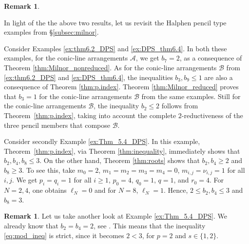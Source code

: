 \documentclass[11pt]{amsart}
\theoremstyle{plain}
\theoremstyle{definition}
\newtheorem{remark}[thm]{Remark}
\begin{document}
\begin{remark}
\label{rem:ex_milnor}
 
In light of the the above two results, %
let us revisit the Halphen pencil type examples from \S\ref{subsec:milnor}.

Consider Examples \ref{ex:thm6.2_DPS} and \ref{ex:DPS_thm6.4}. In both these examples, for the conic-line arrangements $\mathcal{A}$, we get $b_7 = 2$, as a consequence of Theorem \ref{thm:Milnor_nonreduced}.
 As for the conic-line arrangements $\mathcal{B}$ from \ref{ex:thm6.2_DPS} and \ref{ex:DPS_thm6.4}, the inequalities $b_3, b_9 \leq 1$ are also a consequence of Theorem 
\ref{thm:p.index}. Theorem \ref{thm:Milnor_reduced} proves that $b_3=1$ for the conic-line arrangements $\mathcal{B}$ from the same examples.
Still for the conic-line arrangements $\mathcal{B}$, the inequality $b_2 \leq 2$ follows from Theorem~\ref{thm:p.index}, taking into account the complete $2$-reductiveness of the three pencil members that compose $\mathcal{B}$. 

Consider secondly Example \ref{ex:Thm_5.4_DPS}. In this example, Theorem~\ref{thm:p.index}, via Theorem \ref{thm:inequality}, immediately shows that $b_2,b_4,b_8 \leq 3$.
On the other hand, Theorem \ref{thm:roots} shows that $b_2, b_4 \geq 2$ and $b_8 \geq 3$. To see this, take   $m_0=2$, $m_1=m_2=m_3=m_4 =0$, 
$m_{i,j}=\nu_{i,j}=1$ for all $i,j$. 
 We get $p_i=q_i=1$ for all $i \geq 1$, $p_0=4$, $q_0=1$, $q=1$, and $r_0=4$.
 For $N=2,4$, one obtains $\ell_N=0$ and for $N=8$, $\ell_N=1$.
Hence, $2 \leq b_2, b_4 \leq  3$ and $b_8 = 3$.
\end{remark}

\begin{remark}
\label{rem:another_Yoshinaga_counterex}
Let us take another look at  Example \ref{ex:Thm_5.4_DPS}.
We already know that $b_2=b_4=2$, see \cite[Theorem 5.4]{DPS}. This means that the inequality \eqref{eq:mod_ineq} is strict, since it becomes $2<3$, for $p=2$ and $s \in \{1,2\}$.\\
\end{remark}
\end{document}
